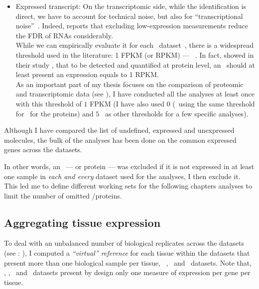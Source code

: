 \begin{itemize}
\begin{itemize}
                \item\textsf{Expressed transcript}:\label{subsubsec:exprTrans} %
                On the transcriptomic side,
                while the identification is direct,
                we have to account for technical noise,
                but also for \enquote{transcriptional noise}~.
                Indeed, \citet{seqcmaqc} reports that
                excluding low-expression measurements reduce the \gls{FDR}
                of \glspl{RNA} considerably.\\
                While we can empirically evaluate it for each \Rnaseq\
                dataset~,
                there is a widespread threshold used in the literature:
                1 \gls{FPKM} (or \gls{RPKM}) --- \eg{}~\citet{Uhlen2014,Uhlen2015}.
                In fact, \citet{Hebenstreit:2011} showed in their study
                \paper{\citetitle{Hebenstreit:2011}},
                that to be detected and quantified at protein level,
                an \mRNA\ should at least present an expression equals to 1 \gls{RPKM}.\\
                As an important part of my thesis focuses on
                the comparison of proteomic and transcriptomic data (see ),
                I have conducted all the analyses at least once with this threshold of $1$ \gls{FPKM}
                (I have also used $0$ (\ie\ using the same threshold for \mRNAs\
                for the proteins) and $5$ \FPKM\ as other thresholds
                for a few specific analyses).
        \end{itemize}
\end{itemize}

\vspace{-0.1in}
Although I have compared the list of
undefined, expressed and unexpressed molecules,
the bulk of the analyses has been done on the common expressed genes across
the datasets.\mybr\

In other words, an \mRNA\ --- or protein --- was excluded
if it is not expressed in at least
one sample in \emph{each and every} dataset used for the analyses,
I then exclude it.
This led me to define different working sets for the following chapters analyses
to limit the number of omitted \mRNAs/proteins.\mybr\

\subsection{Aggregating tissue expression}\label{subsec:averagedTissue}
\vspace{-0.15in}
To deal with an unbalanced number of biological replicates
across the datasets (see :
\nameref{sec:expDesign}),
I computed a \emph{\enquote{virtual} reference} for each tissue
within the datasets that present more than one biological sample per tissue,
\ie\ \vt, \uhlen\ and \gtex\ datasets.
Note that, \castle, \cutler, \kuster\ and \pandey\ datasets present by design only
one measure of expression per gene per tissue.\mybr\

